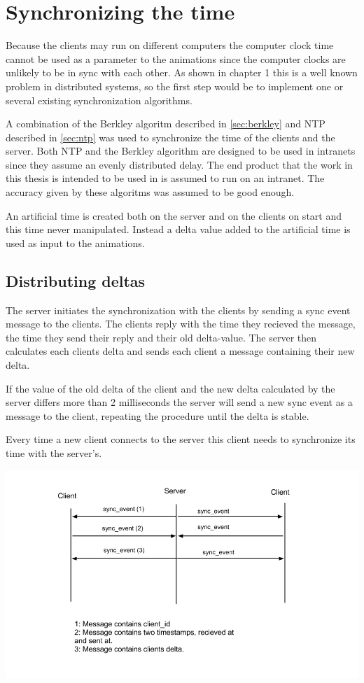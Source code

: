 \section{Synchronizing the time}

Because the clients may run on different computers the computer clock time cannot be used as a parameter to the animations since the computer clocks are unlikely to be in sync with each other. As shown in chapter 1 this is a well known problem in distributed systems, so the first step would be to implement one or several existing synchronization algorithms. 

A combination of the Berkley algoritm described in \ref{sec:berkley} and NTP described in \ref{sec:ntp} was used to synchronize the time of the clients and the server. Both NTP and the Berkley algorithm are designed to be used in intranets since they assume an evenly distributed delay. The end product that the work in this thesis is intended to be used in is assumed to run on an intranet. The accuracy given by these algoritms was assumed to be good enough. 

An artificial time is created both on the server and on the clients on start and this time never manipulated. Instead a delta value added to the artificial time is used as input to the animations.  

\subsection {Distributing deltas}

The server initiates the synchronization with the clients by sending a sync event message to the clients. The clients reply with the time they recieved the message, the time they send their reply and their old delta-value. The server then calculates each clients delta and sends each client a message containing their new delta. 

If the value of the old delta of the client and the new delta calculated by the server differs more than 2 milliseconds the server will send a new sync event as a message to the client, repeating the procedure until the delta is stable. 

Every time a new client connects to the server this client needs to synchronize its time with the server's. 

\includegraphics[width=1.0\textwidth]{figures/comm.png}

